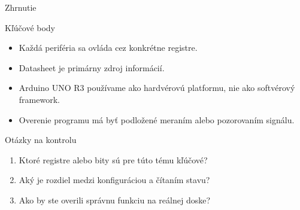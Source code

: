 
\begin{frame}{Zhrnutie}
\begin{tukebox}{Kľúčové body}
\begin{itemize}
    \item Každá periféria sa ovláda cez konkrétne registre.
    \item Datasheet je primárny zdroj informácií.
    \item Arduino UNO R3 používame ako hardvérovú platformu, nie ako softvérový framework.
    \item Overenie programu má byť podložené meraním alebo pozorovaním signálu.
\end{itemize}
\end{tukebox}
\end{frame}

\begin{frame}{Otázky na kontrolu}
\begin{enumerate}
    \item Ktoré registre alebo bity sú pre túto tému kľúčové?
    \item Aký je rozdiel medzi konfiguráciou a čítaním stavu?
    \item Ako by ste overili správnu funkciu na reálnej doske?
\end{enumerate}
\end{frame}
